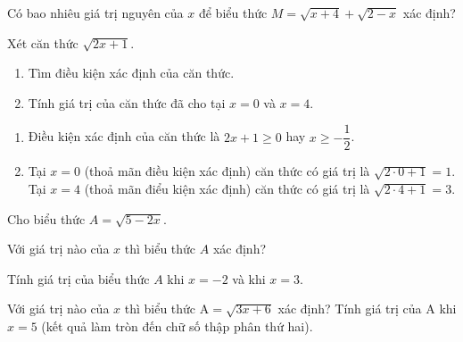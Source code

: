 \begin{vd}%
	Có bao nhiêu giá trị nguyên của $x$ để biểu thức $M=\sqrt{x+4}+\sqrt{2-x}$ xác định?
\end{vd}
\begin{vd}
	Xét căn thức $\sqrt{2 x+1}$.
	\begin{enumerate}
	\item Tìm điều kiện xác định của căn thức.
	\item Tính giá trị của căn thức đã cho tại $x=0$ và $x=4$.
	\end{enumerate}
	\loigiai
	{
	\begin{enumerate}
	\item Điều kiện xác định của căn thức là $2 x+1 \geq 0$ hay $x \geq-\dfrac{1}{2}$.
	\item Tại $x=0$ (thoả mãn điều kiện xác định) căn thức có giá trị là $\sqrt{2 \cdot 0+1}=1$.
	Tại $x=4$ (thoả mãn điểu kiện xác định) căn thức có giá trị là $\sqrt{2 \cdot 4+1}=3$.
	\end{enumerate}	
	}
\end{vd}
\begin{vd}
	Cho biểu thức $A=\sqrt{5-2x}$.
	\begin{listEX}[1]
	\item Với giá trị nào của $x$ thì biểu thức $A$ xác định?
	\item Tính giá trị của biểu thức $A$ khi $x=-2$ và khi $x=3$.
	\end{listEX}
\end{vd}
\begin{vd} Với giá trị nào của $x$ thì biểu thức $\mathrm{A}=\sqrt{3x+6}$ xác định? Tính giá trị của $\mathrm{A}$ khi $x=5$ (kết quả làm tròn đến chữ số thập phân thứ hai).
\end{vd}
